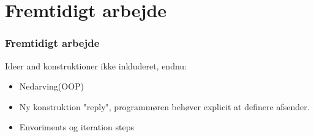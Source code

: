 \section{Fremtidigt arbejde}
\begin{frame}
	\frametitle{Fremtidigt arbejde}
	Ideer and konstruktioner ikke inkluderet, endnu: 
  \begin{itemize}
    \item Nedarving(OOP)
    \item Ny konstruktion "reply", programmøren behøver explicit at definere afsender.
    \item Envoriments og iteration steps
  \end{itemize}
\end{frame}
